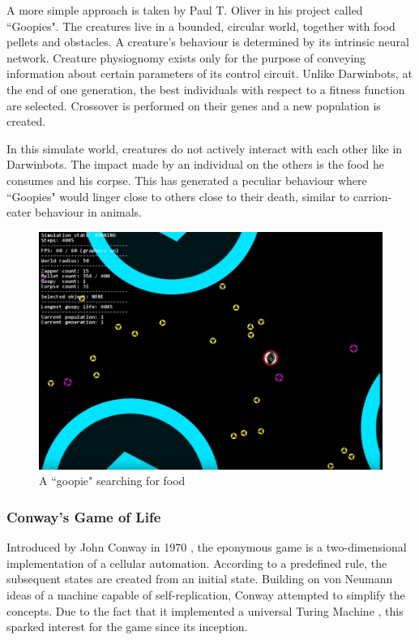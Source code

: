 A more simple approach is taken by Paul T. Oliver in his project called ``Goopies".\cite{goopies} The creatures live in a bounded, circular world, together with food pellets and obstacles. A creature's behaviour is determined by its intrinsic neural network. Creature physiognomy exists only for the purpose of conveying information about certain parameters of its control circuit. Unlike Darwinbots, at the end of one generation, the best individuals with respect to a fitness function are selected. Crossover is performed on their genes and a new population is created.

In this simulate world, creatures do not actively interact with each other like in Darwinbots. The impact made by an individual on the others is the food he consumes and his corpse. This has generated a peculiar behaviour where ``Goopies" would linger close to others close to their death, similar to carrion-eater behaviour in animals.

\begin{figure}[!th]
	\centering
	\includegraphics[scale=0.3]{images/guppies}
	\caption{A ``goopie" searching for food}
\end{figure}

\subsubsection{Conway's Game of Life}
Introduced by John Conway in 1970 \cite{gardner1970mathematical}, the eponymous game is a two-dimensional implementation of a cellular automation. According to a predefined rule, the subsequent states are created from an initial state. Building on von Neumann ideas of a machine capable of self-replication, Conway attempted to simplify the concepts. Due to the fact that it implemented a universal Turing Machine \cite{igblan}, this sparked interest for the game since its inception.

